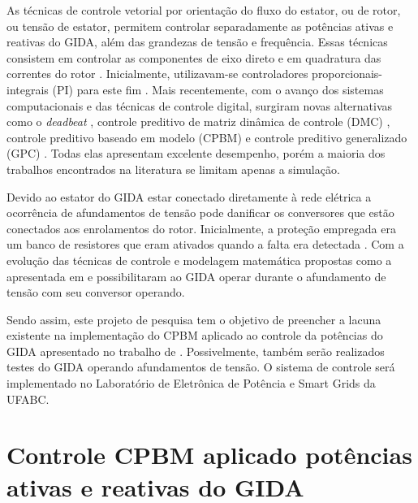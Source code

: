 	As técnicas de controle vetorial por orientação do fluxo do estator, ou de rotor, ou tensão de estator, permitem controlar separadamente as potências ativas e reativas do GIDA, além das grandezas de tensão e frequência. Essas técnicas consistem em controlar as componentes de eixo direto e em quadratura das correntes do rotor \cite{murilodq}. Inicialmente, utilizavam-se controladores proporcionais-integrais (PI) para este fim \cite{alfeu}. Mais recentemente, com o avanço dos sistemas computacionais e das técnicas de controle digital, surgiram novas alternativas como o \emph{deadbeat} \cite{deadbeat,deadbeatieee}, controle preditivo de matriz dinâmica de controle (DMC) \cite{dmcieee}, controle preditivo baseado em modelo (CPBM) \cite{alfeu,paperalfeu} e controle preditivo generalizado (GPC) \cite{gpcieee}. Todas elas apresentam excelente desempenho, porém a maioria dos trabalhos encontrados na literatura se limitam apenas a simulação.
	
	Devido ao estator do GIDA estar conectado diretamente à rede elétrica a ocorrência de afundamentos de tensão pode danificar os conversores que estão conectados aos enrolamentos do rotor. Inicialmente, a proteção empregada era um banco de resistores que eram ativados quando a falta era detectada \cite{rodrigo8afundamento,rodrigo9afundamento}. Com a evolução das técnicas de controle e modelagem matemática propostas como a apresentada em   e  possibilitaram ao GIDA operar durante o afundamento de tensão com seu conversor operando.
	
	Sendo assim, este projeto de pesquisa tem o objetivo de preencher a lacuna existente na implementação do CPBM aplicado ao controle da potências do GIDA apresentado no trabalho de . Possivelmente, também serão realizados testes do GIDA operando afundamentos de tensão. O sistema de controle será implementado no Laboratório de Eletrônica de Potência e Smart Grids da UFABC.
	
	\begingroup
	\let\clearpage\relax
	\chapter{Controle CPBM aplicado potências ativas e reativas do GIDA}
	\endgroup
	
